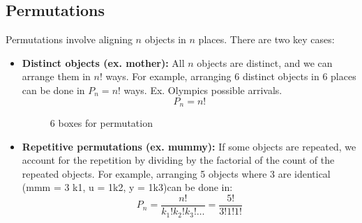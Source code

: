 \subsection{Permutations}
Permutations involve aligning \( n \) objects in \( n \) places. There are two key cases:
\begin{itemize}
    \item \textbf{Distinct objects (ex. mother):} All \( n \) objects are distinct, and we can arrange them in \( n! \) ways. For example, arranging 6 distinct objects in 6 places can be done in \( P_n = n! \) ways. Ex. Olympics possible arrivals.
    \[
    P_n = n! 
    \]
    \vspace{-0.5cm} %
    \begin{figure}[h]
        \centering
        \caption{6 boxes for permutation}
    \end{figure}
    
    
    \item \textbf{Repetitive permutations (ex. mummy):} If some objects are repeated, we account for the repetition by dividing by the factorial of the count of the repeated objects. For example, arranging 5 objects where 3 are identical (mmm = 3 k1, u = 1k2, y = 1k3)can be done in:
    \[
    P_n = \frac{n!}{k_1! k_2! k_3! \dots} = \frac{5!}{3! 1! 1!}
    \]

\end{itemize}



